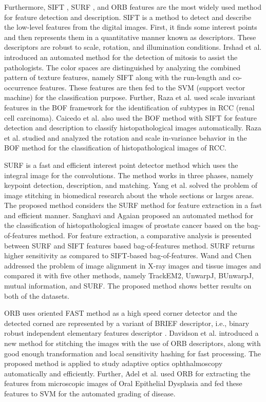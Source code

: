 Furthermore, SIFT \cite{lowe2004}, SURF \cite{bay2008}, and ORB \cite{rublee2011} features are the most widely used method for feature detection and description. SIFT  is a method to detect and describe the low-level features from the digital images. First, it finds some interest points and then represents them in a quantitative manner known as descriptors. These descriptors are robust to scale, rotation, and illumination conditions. Irshad et al. \cite{irshad2013} introduced an automated method for the detection of mitosis to assist the pathologists. The color spaces are distinguished by analyzing the combined pattern of texture features, namely SIFT along with the run-length and co-occurrence features. These features are then fed to the SVM (support vector machine) for the classification purpose. Further, Raza et al. \cite{raza2010} used scale invariant features in the BOF framework for the identification of subtypes in RCC (renal cell carcinoma).  Caicedo et al. \cite{caicedo2009} also used the BOF method with SIFT for feature detection and description to classify histopathological images automatically.  Raza et al. \cite{raza2011} studied and analyzed the rotation and scale in-variance behavior in the  BOF method for the classification of histopathological images of RCC.


SURF \cite{bay2008} is a fast and efficient interest point detector method which uses the integral image for the convolutions. The method works in three phases, namely keypoint detection, description, and matching. Yang et al. \cite{yang2013} solved the problem of image stitching in biomedical research about the whole sections or larges areas. The proposed method considers the SURF method for feature extraction in a fast and efficient manner. Sanghavi and Agaian \cite{sanghavi2016} proposed an automated method for the classification of histopathological images of prostate cancer based on the bag-of-features method. For feature extraction, a comparative analysis is presented between SURF and SIFT features based bag-of-features method. SURF returns higher sensitivity as compared to SIFT-based bag-of-features.  Wand and Chen \cite{wang2013} addressed the problem of image alignment in X-ray images and tissue images and compared it with five other methods, namely TrackEM2, UnwarpJ, BUnwarpJ, mutual information, and SURF. The proposed method shows better results on both of the datasets.


ORB \cite{rublee2011} uses oriented FAST \cite{tuzel2006} method as a high speed corner detector and the detected corned are represented by a variant of BRIEF descriptor, i.e., binary robust independent elementary features  descriptor \cite{calonder2011}. Davidson et al. \cite{davidson2018} introduced a new method for stitching the images with the use of ORB descriptors, along with good enough transformation and local sensitivity hashing for fast processing. The proposed method is applied to study adaptive optics ophthalmoscopy automatically and efficiently. Further, Adel et al. \cite{adel2018} used ORB for extracting the features from microscopic images of Oral Epithelial Dysplasia and fed these features to SVM for the automated grading of disease. 


